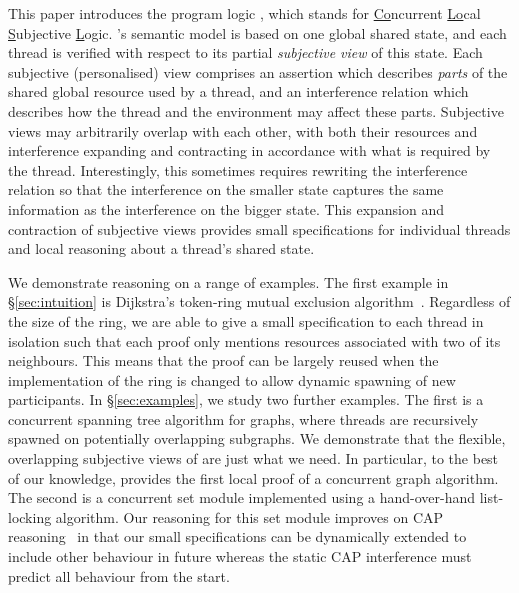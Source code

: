 This paper introduces the program logic \colosl, which stands for
\underline{Co}ncurrent \underline{Lo}cal \underline{S}ubjective
\underline{L}ogic. \colosl's semantic model is based on one global
shared state, and each thread is verified with respect to its partial
{\em subjective view} of this state.  Each subjective (personalised)
view comprises an assertion which describes \emph{parts} of the shared
global resource used by a thread, and an interference relation which
describes how the thread and the environment may affect these parts.
Subjective views may arbitrarily overlap with each other, with both
their resources and interference expanding and contracting in
accordance with what is required by the thread. Interestingly, this
sometimes requires rewriting the interference relation so that the
interference on the smaller state captures the same information as the
interference on the bigger state. This expansion and contraction of
subjective views provides small specifications for individual threads
and local reasoning about a thread's shared state.



We demonstrate \colosl reasoning on a range of examples.  The first
example in \S\ref{sec:intuition} is Dijkstra's token-ring mutual
exclusion algorithm~\cite{dijkstra74}. Regardless of the size of the
ring, we are able to give a small specification to  each thread in
isolation such that each proof only mentions resources
associated with two of its neighbours. This means that the proof can be largely reused when the
implementation of the ring is changed to allow dynamic spawning of new
participants.  In \S\ref{sec:examples}, we study two further
examples. The first is a concurrent spanning tree algorithm for
graphs, where threads are recursively spawned on potentially
overlapping subgraphs. We demonstrate that the flexible, overlapping
subjective views of \colosl are just what we need. In particular, to
the best of our knowledge,
\colosl provides the first local proof of a concurrent graph algorithm.
The second is a concurrent set module implemented 
using a hand-over-hand
list-locking algorithm. Our \colosl reasoning  for this set module  improves
on CAP reasoning~\cite{cap-ecoop10} in that our small
specifications can be dynamically extended to include other behaviour
in future
whereas the  static CAP interference  must predict all behaviour from the start. 



